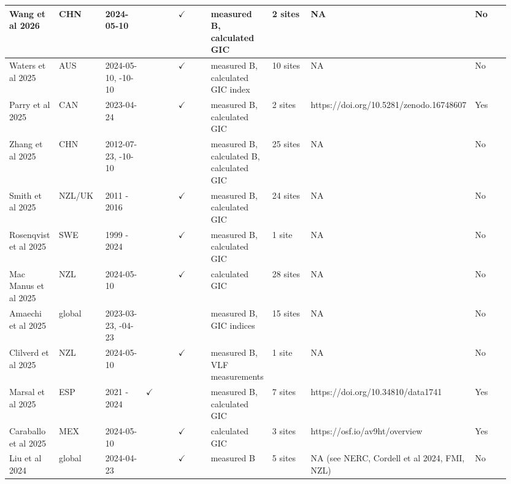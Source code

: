 \begin{longtable}{p{0.106\linewidth}p{0.106\linewidth}p{0.106\linewidth}p{0.106\linewidth}p{0.106\linewidth}p{0.106\linewidth}p{0.106\linewidth}p{0.106\linewidth}p{0.106\linewidth}}
Wang et al 2026 & CHN & 2024-05-10 &  & $\checkmark$ & measured B, \newline calculated GIC & 2 sites & NA & No \\ \hline
Waters et al 2025 & AUS & 2024-05-10, \newline 2024-10-10 &  & $\checkmark$ & measured B, \newline calculated GIC index & 10 sites & NA & No \\ \hline
Parry et al 2025 & CAN & 2023-04-24 &  & $\checkmark$ & measured B, \newline calculated GIC & 2 sites & https://doi.org/10.5281/zenodo.16748607 & Yes \\ \hline
Zhang et al 2025 & CHN & 2012-07-23, \newline 2024-10-10 &  &  & measured B, \newline calculated B, \newline calculated GIC & 25 sites & NA & No \\ \hline
Smith et al 2025 & NZL/UK & 2011 - 2016 &  & $\checkmark$ & measured B, \newline calculated GIC & 24 sites & NA & No \\ \hline
Rosenqvist et al 2025 & SWE & 1999 - 2024 &  & $\checkmark$ & measured B, \newline calculated GIC & 1 site & NA & No \\ \hline
Mac Manus et al 2025 & NZL & 2024-05-10 &  & $\checkmark$ & calculated GIC & 28 sites & NA & No \\ \hline
Amaechi et al 2025 & global & 2023-03-23, \newline 2023-04-23 &  &  & measured B, \newline GIC indices & 15 sites & NA & No \\ \hline
Clilverd et al 2025 & NZL & 2024-05-10 &  & $\checkmark$ & measured B, \newline VLF measurements & 1 site & NA & No \\ \hline
Marsal et al 2025 & ESP & 2021 - 2024 & $\checkmark$ &  & measured B, \newline calculated GIC & 7 sites & https://doi.org/10.34810/data1741 & Yes \\ \hline
Caraballo et al 2025 & MEX & 2024-05-10 &  & $\checkmark$ & calculated GIC & 3 sites & https://osf.io/av9ht/overview & Yes \\ \hline
Liu et al 2024 & global & 2024-04-23 &  & $\checkmark$ & measured B & 5 sites & NA (see NERC, \newline Cordell et al 2024, \newline FMI, \newline NZL) & No \\ \hline

\end{longtable}
